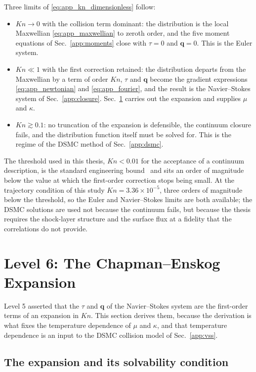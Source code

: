 Three limits of \eqref{eq:app_kn_dimensionless} follow:
\begin{itemize}
    \item $Kn \to 0$ with the collision term dominant: the distribution is the local Maxwellian \eqref{eq:app_maxwellian} to zeroth order, and the five moment equations of Sec.~\ref{app:moments} close with $\tau = 0$ and $\mathbf{q} = 0$. This is the Euler system.
    \item $Kn \ll 1$ with the first correction retained: the distribution departs from the Maxwellian by a term of order $Kn$, $\tau$ and $\mathbf{q}$ become the gradient expressions \eqref{eq:app_newtonian} and \eqref{eq:app_fourier}, and the result is the Navier--Stokes system of Sec.~\ref{app:closure}. Sec.~\ref{app:ce} carries out the expansion and supplies $\mu$ and $\kappa$.
    \item $Kn \gtrsim 0.1$: no truncation of the expansion is defensible, the continuum closure fails, and the distribution function itself must be solved for. This is the regime of the DSMC method of Sec.~\ref{app:dsmc}.
\end{itemize}
The threshold used in this thesis, $Kn < 0.01$ for the acceptance of a continuum description, is the standard engineering bound~\cite{tsien1946,bird1994molecular} and sits an order of magnitude below the value at which the first-order correction stops being small. At the trajectory condition of this study $Kn = 3.36\times10^{-5}$, three orders of magnitude below the threshold, so the Euler and Navier--Stokes limits are both available; the DSMC solutions are used not because the continuum fails, but because the thesis requires the shock-layer structure and the surface flux at a fidelity that the correlations do not provide.

\section{Level 6: The Chapman--Enskog Expansion}
\label{app:ce}

Level 5 asserted that the $\tau$ and $\mathbf{q}$ of the Navier--Stokes system are the first-order terms of an expansion in $Kn$. This section derives them, because the derivation is what fixes the temperature dependence of $\mu$ and $\kappa$, and that temperature dependence is an input to the DSMC collision model of Sec.~\ref{app:vss}.

\subsection{The expansion and its solvability condition}

